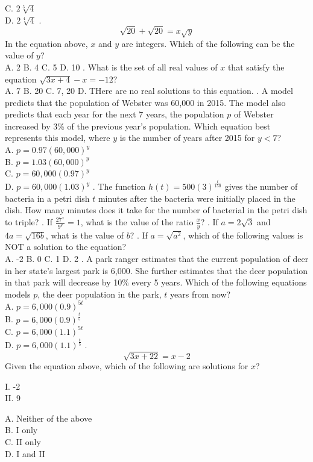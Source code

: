 \documentclass[../satmath.tex]{subfiles}
\begin{document}
C. $2\sqrt[5]{4}$\\
D. $2\sqrt[4]{4}$
. 
\[\sqrt{20}+\sqrt{20}=x\sqrt{y}\]
In the equation above, $x$ and $y$ are integers. Which of the following can be the value of $y$?\\
A. 2 \quad B. 4 \quad C. 5 \quad D. 10
. What is the set of all real values of $x$ that satisfy the equation $\sqrt{3x+4}-x=-12$? \\
A. {7} \quad B. {20} \quad C. {7, 20} \quad D. THere are no real solutions to this equation.
. A model predicts that the population of Webster was 60,000 in 2015. The model also predicts that each year for the next 7 years, the population $p$ 
of Webster increased by 3\% of the previous year's population. Which equation best represents this model, where $y$ is the number of years after 2015 for $y<7$?\\
A. $p=0.97(60,000)^y$\\
B. $p=1.03(60,000)^y$\\
C. $p=60,000(0.97)^y$\\
D. $p=60,000(1.03)^y$
. The function $h(t)=500(3)^{\frac{t}{150}}$ gives the number of bacteria in a petri dish $t$ minutes after the bacteria were initially placed 
in the dish. How many minutes does it take for the number of bacterial in the petri dish to triple?
. If $\frac{27^x}{9^y}=1$, what is the value of the ratio $\frac{x}{y}$?
. If $a=2\sqrt{3}$ and $4a=\sqrt{16b}$, what is the value of $b$?
. If $a=\sqrt{a^2}$, which of the following values is NOT a solution to the equation?\\
A. -2 \quad B. 0 \quad C. 1 \quad D. 2
. A park ranger estimates that the current population of deer in her state's largest park is 6,000. She further estimates that the deer population 
in that park will decrease by 10\% every 5 years. Which of the following equations models $p$, the deer population in the park, $t$ years from now?\\
A. $p=6,000(0.9)^{5t}$\\
B. $p=6,000(0.9)^{\frac{t}{5}}$\\
C. $p=6,000(1.1)^{5t}$\\
D. $p=6,000(1.1)^{\frac{t}{5}}$
. 
\[\sqrt{3x+22}=x-2\]
Given the equation above, which of the following are solutions for $x$?

I. -2 \\
II. 9

A. Neither of the above\\
B. I only\\
C. II only\\
D. I and II 
\end{document}
